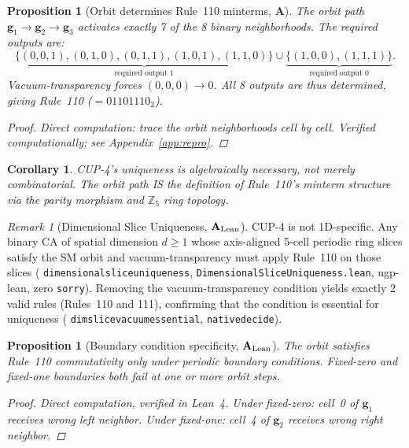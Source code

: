 \documentclass[11pt]{article}
\newtheorem{proposition}[theorem]{Proposition}
\newtheorem{corollary}[theorem]{Corollary}
\theoremstyle{remark}
\newtheorem{remark}[theorem]{Remark}
\newcommand{\lean}[1]{%
  \penalty-100
  \begingroup\def\_{\textunderscore\allowbreak}\texttt{#1}\endgroup}
\newcommand{\CatA}{\textbf{A}}
\newcommand{\CatAL}{\ensuremath{\textbf{A}_{\rm Lean}}}
\begin{document}
\begin{proposition}[Orbit determines Rule~110 minterms, $\CatA$]
\label{prop:minterms}
The orbit path $\mathbf{g}_1 \to \mathbf{g}_2 \to \mathbf{g}_3$ activates exactly 7
of the 8 binary neighborhoods. The required outputs are:
\begin{equation}
\underbrace{\{(0,0,1),(0,1,0),(0,1,1),(1,0,1),(1,1,0)\}}_{\text{required output }1}
\cup
\underbrace{\{(1,0,0),(1,1,1)\}}_{\text{required output }0}.
\label{eq:required_outputs}
\end{equation}
Vacuum-transparency forces $(0,0,0) \to 0$.
All 8 outputs are thus determined, giving Rule~110 ($= 01101110_2$).
\begin{proof}
Direct computation: trace the orbit neighborhoods cell by cell.
Verified computationally; see Appendix~\ref{app:repro}.
\end{proof}
\end{proposition}

\begin{corollary}
CUP-4's uniqueness is algebraically necessary, not merely combinatorial.
The orbit path IS the definition of Rule~110's minterm structure
via the parity morphism and $\mathbb{Z}_5$ ring topology.
\end{corollary}

\begin{remark}[Dimensional Slice Uniqueness, $\CatAL$]
\label{rem:dsu_cup4}
CUP-4 is not 1D-specific.
Any binary CA of spatial dimension $d \geq 1$ whose axis-aligned 5-cell periodic ring
slices satisfy the SM orbit and vacuum-transparency must apply Rule~110 on those slices
(\lean{dimensional\_slice\_uniqueness}, \lean{Dimensional\-Slice\-Uniqueness.lean},
ugp-lean, zero \texttt{sorry}).
Removing the vacuum-transparency condition yields exactly 2 valid rules (Rules~110 and 111),
confirming that the condition is essential for uniqueness
(\lean{dim\_slice\_vacuum\_essential}, \lean{native\_decide}).
\end{remark}

\begin{proposition}[Boundary condition specificity, $\CatAL$]
\label{prop:bc}
The orbit satisfies Rule~110 commutativity \emph{only} under periodic boundary conditions.
Fixed-zero and fixed-one boundaries both fail at one or more orbit steps.
\begin{proof}
Direct computation, verified in Lean~4.
Under fixed-zero: cell~0 of $\mathbf{g}_1$ receives wrong left neighbor.
Under fixed-one: cell~4 of $\mathbf{g}_2$ receives wrong right neighbor.
\end{proof}
\end{proposition}
\end{document}
